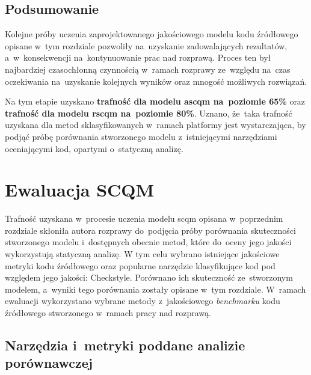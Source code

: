 \documentclass[twoside]{praca}
\begin{document}
\pagebreak

\section{Podsumowanie}

Kolejne próby uczenia zaprojektowanego jakościowego modelu kodu źródłowego opisane w~tym rozdziale pozwoliły na~uzyskanie zadowalających rezultatów, a~w~konsekwencji na~kontynuowanie prac nad rozprawą. Proces ten był najbardziej czasochłonną czynnością w~ramach rozprawy ze~względu na~czas oczekiwania na~uzyskanie kolejnych wyników oraz mnogość możliwych rozwiązań.

Na tym etapie uzyskano \textbf{trafność dla modelu \gls{ascqm} na~poziomie 65\%} oraz \textbf{trafność dla modelu \gls{rscqm} na~poziomie 80\%}. Uznano, że~taka trafność uzyskana dla metod sklasyfikowanych w~ramach platformy jest wystarczająca, by podjąć próbę porównania stworzonego modelu z~istniejącymi narzędziami oceniającymi kod, opartymi o~statyczną analizę.

\cleardoublepage
\chapter{Ewaluacja SCQM}
\label{ch:eval}

\begin{addmargin}{1cm}
Trafność uzyskana w~procesie uczenia modelu \gls{scqm} opisana w~poprzednim rozdziale skłoniła autora rozprawy do~podjęcia próby porównania skuteczności stworzonego modelu i~dostępnych obecnie metod, które do~oceny jego jakości wykorzystują statyczną analizę. 
W tym celu wybrano istniejące jakościowe metryki kodu źródłowego oraz popularne narzędzie klasyfikujące kod pod względem jego jakości: Checkstyle. Porównano ich skuteczność ze~stworzonym modelem, a~wyniki tego porównania zostały opisane w~tym rozdziale. W~ramach ewaluacji wykorzystano wybrane metody z~jakościowego \textit{benchmarku} kodu źródłowego stworzonego w~ramach pracy nad rozprawą.
\end{addmargin}

\section{Narzędzia i~metryki poddane analizie porównawczej}
\label{sec:eval:others}
\end{document}
